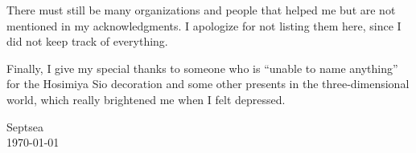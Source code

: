 There must still be many organizations and people
that helped me but are not mentioned in my acknowledgments.
I apologize for not listing them here,
since I did not keep track of everything.

Finally, I give my special thanks to someone
who is ``unable to name anything''
for the Hosimiya Sio decoration
and some other presents in the three-dimensional world,
which really brightened me when I felt depressed.

\begin{flushright}
    Septsea\\
    \today
\end{flushright}
